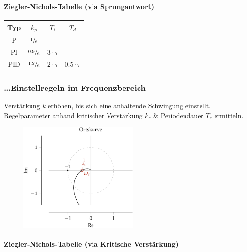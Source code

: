 \documentclass[
  10pt,
  a4paper,
  twocolumn]{article}
\let\oldparagraph\paragraph
\renewcommand{\paragraph}[1]{\oldparagraph{#1}\mbox{}}
\numberwithin{equation}{section}
\let\paragraph\oldparagraph
\renewcommand{\paragraph}[1]{\oldparagraph{#1}\mbox{}\par}
\begin{document}
\hypertarget{ziegler-nichols-tabelle-via-sprungantwort}{%
\paragraph{Ziegler-Nichols-Tabelle (via
Sprungantwort)}\label{ziegler-nichols-tabelle-via-sprungantwort}}

\begin{center}
\begin{tabular}{|c|c|c|c|}
\hline
Typ & $k_p$ & $T_i$ & $T_d$ \\
\hline
P   & $\sfrac{1}{a}$     & \-           & \- \\
PI  & $\sfrac{0.9}{a}$   & $3\cdot\tau$ & \- \\
PID & $\sfrac{1.2}{a}$   & $2\cdot\tau$ & $0.5\cdot\tau$ \\
\hline
\end{tabular}
\end{center}

\hypertarget{einstellregeln-im-frequenzbereich}{%
\subsubsection{\ldots Einstellregeln im
Frequenzbereich}\label{einstellregeln-im-frequenzbereich}}

Verstärkung \(k\) erhöhen, bis sich eine anhaltende Schwingung
einstellt. Regelparameter anhand kritischer Verstärkung \(k_c\) \&
Periodendauer \(T_c\) ermitteln.

\begin{figure}[H]

{\centering \includegraphics[width=6cm,height=\textheight]{images/paste-26.png}

}

\end{figure}

\hypertarget{ziegler-nichols-tabelle-via-kritische-verstuxe4rkung}{%
\paragraph{Ziegler-Nichols-Tabelle (via Kritische
Verstärkung)}\label{ziegler-nichols-tabelle-via-kritische-verstuxe4rkung}}
\end{document}
